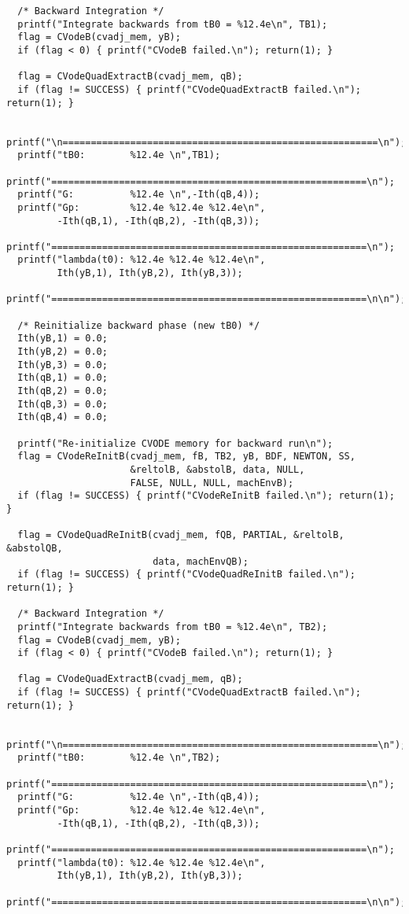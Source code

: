 \begin{verbatim}
  /* Backward Integration */
  printf("Integrate backwards from tB0 = %12.4e\n", TB1);
  flag = CVodeB(cvadj_mem, yB);
  if (flag < 0) { printf("CVodeB failed.\n"); return(1); }

  flag = CVodeQuadExtractB(cvadj_mem, qB);
  if (flag != SUCCESS) { printf("CVodeQuadExtractB failed.\n"); return(1); }

  printf("\n========================================================\n");
  printf("tB0:        %12.4e \n",TB1);
  printf("========================================================\n");
  printf("G:          %12.4e \n",-Ith(qB,4));
  printf("Gp:         %12.4e %12.4e %12.4e\n", 
         -Ith(qB,1), -Ith(qB,2), -Ith(qB,3));
  printf("========================================================\n");
  printf("lambda(t0): %12.4e %12.4e %12.4e\n", 
         Ith(yB,1), Ith(yB,2), Ith(yB,3));
  printf("========================================================\n\n");

  /* Reinitialize backward phase (new tB0) */
  Ith(yB,1) = 0.0;
  Ith(yB,2) = 0.0;
  Ith(yB,3) = 0.0;
  Ith(qB,1) = 0.0;
  Ith(qB,2) = 0.0;
  Ith(qB,3) = 0.0;
  Ith(qB,4) = 0.0;

  printf("Re-initialize CVODE memory for backward run\n");
  flag = CVodeReInitB(cvadj_mem, fB, TB2, yB, BDF, NEWTON, SS, 
                      &reltolB, &abstolB, data, NULL, 
                      FALSE, NULL, NULL, machEnvB);
  if (flag != SUCCESS) { printf("CVodeReInitB failed.\n"); return(1); }

  flag = CVodeQuadReInitB(cvadj_mem, fQB, PARTIAL, &reltolB, &abstolQB, 
                          data, machEnvQB);
  if (flag != SUCCESS) { printf("CVodeQuadReInitB failed.\n"); return(1); }

  /* Backward Integration */
  printf("Integrate backwards from tB0 = %12.4e\n", TB2);
  flag = CVodeB(cvadj_mem, yB);
  if (flag < 0) { printf("CVodeB failed.\n"); return(1); }

  flag = CVodeQuadExtractB(cvadj_mem, qB);
  if (flag != SUCCESS) { printf("CVodeQuadExtractB failed.\n"); return(1); }

  printf("\n========================================================\n");
  printf("tB0:        %12.4e \n",TB2);
  printf("========================================================\n");
  printf("G:          %12.4e \n",-Ith(qB,4));
  printf("Gp:         %12.4e %12.4e %12.4e\n", 
         -Ith(qB,1), -Ith(qB,2), -Ith(qB,3));
  printf("========================================================\n");
  printf("lambda(t0): %12.4e %12.4e %12.4e\n", 
         Ith(yB,1), Ith(yB,2), Ith(yB,3));
  printf("========================================================\n\n");


\end{verbatim}
